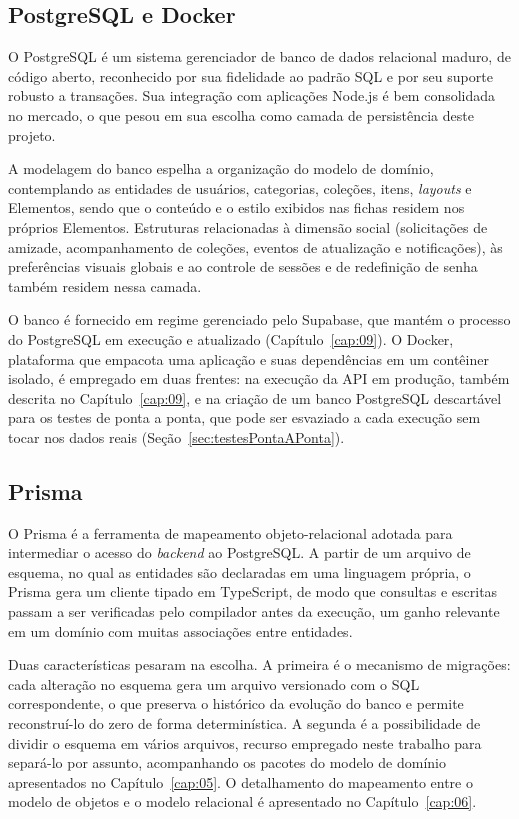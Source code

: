 \subsection{PostgreSQL e Docker}

O PostgreSQL é um sistema gerenciador de banco de dados relacional maduro, de código aberto, reconhecido por sua fidelidade ao padrão SQL e por seu suporte robusto a transações. Sua integração com aplicações Node.js é bem consolidada no mercado, o que pesou em sua escolha como camada de persistência deste projeto.

A modelagem do banco espelha a organização do modelo de domínio, contemplando as entidades de usuários, categorias, coleções, itens, \textit{layouts} e Elementos, sendo que o conteúdo e o estilo exibidos nas fichas residem nos próprios Elementos. Estruturas relacionadas à dimensão social (solicitações de amizade, acompanhamento de coleções, eventos de atualização e notificações), às preferências visuais globais e ao controle de sessões e de redefinição de senha também residem nessa camada.

O banco é fornecido em regime gerenciado pelo Supabase, que mantém o processo do PostgreSQL em execução e atualizado (Capítulo~\ref{cap:09}). O Docker, plataforma que empacota uma aplicação e suas dependências em um contêiner isolado, é empregado em duas frentes: na execução da API em produção, também descrita no Capítulo~\ref{cap:09}, e na criação de um banco PostgreSQL descartável para os testes de ponta a ponta, que pode ser esvaziado a cada execução sem tocar nos dados reais (Seção~\ref{sec:testesPontaAPonta}).

\subsection{Prisma}

O Prisma é a ferramenta de mapeamento objeto-relacional adotada para intermediar o acesso do \textit{backend} ao PostgreSQL. A partir de um arquivo de esquema, no qual as entidades são declaradas em uma linguagem própria, o Prisma gera um cliente tipado em TypeScript, de modo que consultas e escritas passam a ser verificadas pelo compilador antes da execução, um ganho relevante em um domínio com muitas associações entre entidades.

Duas características pesaram na escolha. A primeira é o mecanismo de migrações: cada alteração no esquema gera um arquivo versionado com o SQL correspondente, o que preserva o histórico da evolução do banco e permite reconstruí-lo do zero de forma determinística. A segunda é a possibilidade de dividir o esquema em vários arquivos, recurso empregado neste trabalho para separá-lo por assunto, acompanhando os pacotes do modelo de domínio apresentados no Capítulo~\ref{cap:05}. O detalhamento do mapeamento entre o modelo de objetos e o modelo relacional é apresentado no Capítulo~\ref{cap:06}.


